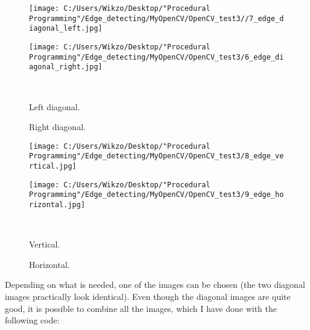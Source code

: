 \begin{figure}[htbp]\centering
	\begin{minipage}[b]{0.48\textwidth}\centering
		\texttt{[image: C:/Users/Wikzo/Desktop/"Procedural Programming"/Edge\_detecting/MyOpenCV/OpenCV\_test3//7\_edge\_diagonal\_left.jpg]} %
	\end{minipage}\hfill
	\begin{minipage}[b]{0.48\textwidth}\centering
		\texttt{[image: C:/Users/Wikzo/Desktop/"Procedural Programming"/Edge\_detecting/MyOpenCV/OpenCV\_test3/6\_edge\_diagonal\_right.jpg]} %
	\end{minipage}\\ %
	\begin{minipage}[t]{0.48\textwidth}
		\caption{Left diagonal.} %
		\label{left_diagonal}
	\end{minipage}\hfill
	\begin{minipage}[t]{0.48\textwidth}
		\caption{Right diagonal.} %
		\label{right_diagonal}
	\end{minipage}
\end{figure}

\begin{figure}[htbp]\centering
	\begin{minipage}[b]{0.48\textwidth}\centering
		\texttt{[image: C:/Users/Wikzo/Desktop/"Procedural Programming"/Edge\_detecting/MyOpenCV/OpenCV\_test3/8\_edge\_vertical.jpg]} %
	\end{minipage}\hfill
	\begin{minipage}[b]{0.48\textwidth}\centering
		\texttt{[image: C:/Users/Wikzo/Desktop/"Procedural Programming"/Edge\_detecting/MyOpenCV/OpenCV\_test3/9\_edge\_horizontal.jpg]} %
	\end{minipage}\\ %
	\begin{minipage}[t]{0.48\textwidth}
		\caption{Vertical.} %
		\label{vertical}
	\end{minipage}\hfill
	\begin{minipage}[t]{0.48\textwidth}
		\caption{Horizontal.} %
		\label{horizontal}
	\end{minipage}
\end{figure}

Depending on what is needed, one of the images can be chosen (the two diagonal images practically look identical). Even though the diagonal images are quite good, it is possible to combine all the images, which I have done with the following code:

